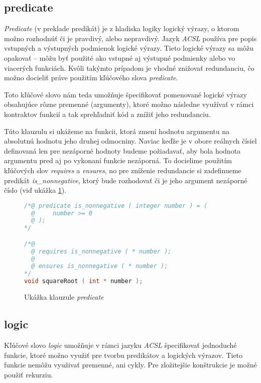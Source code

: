 \subsection{predicate}

\emph{Predicate} (v preklade predikát) je z hladiska logiky logický výrazy, o ktorom možno rozhodnúť či je pravdivý, alebo nepravdivý. \cite{predikat-wiki} Jazyk \emph{ACSL} používa pre popis vstupných a výstupných podmienok logické výrazy. Tieto logické výrazy sa môžu opakovať -- môžu byť použité ako vstupné aj výstupné podmienky alebo vo viacerých funkciách. Kvôli takýmto prípadom je vhodné znižovať redundanciu, čo možno docieliť práve použitím kľúčového slova \emph{predicate}. 

Toto kľúčové slovo nám teda umožňuje špecifikovať pomenované logické výrazy obsahujúce rôzne premenné (argumenty), ktoré možno následne využívať v rámci kontraktov funkcií a tak sprehľadniť kód a znížiť jeho redundanciu. 

Túto klauzulu si ukážeme na funkcii, ktorá zmení hodnotu argumentu na absolutnú hodnotu jeho druhej odmocniny. Naviac keďže je v obore reálnych čísiel definovaná len pre nezáporné hodnoty budeme požiadavať, aby bola hodnota argumentu pred aj po vykonaní funkcie nezáporná. To docielime použitím kľúčových slov \emph{requires} a \emph{ensures}, no pre zníženie redundancie si zadefinueme predikát \emph{is\_nonnegative}, ktorý bude rozhodovať či je jeho argument nezáporné číslo (viď ukážka \ref{fig:predicate}).

\begin{figure}[H]
    \centering
    \captionsetup{justification=centering}
\begin{lstlisting}[language=C]
/*@ predicate is_nonnegative ( integer number ) = (
  @     number >= 0
  @ );
*/

/*@
  @ requires is_nonnegative ( * number );
  @
  @ ensures is_nonnegative ( * number );
*/
void squareRoot ( int * number );
\end{lstlisting}
    \caption{Ukážka klauzule \emph{predicate}}
    \label{fig:predicate}
\end{figure}

\subsection{logic}

Kľúčové slovo \emph{logic} umožňuje v rámci jazyku \emph{ACSL} špecifikovať jednoduché funkcie, ktoré možno využiť pre tvorbu predikátov a logických výrazov. Tieto funkcie nemôžu využivať premenné, ani cykly. Pre zložitejšie konštrukcie je možné použiť rekurziu.

